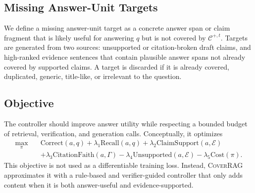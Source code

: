 \subsection{Missing Answer-Unit Targets}

We define a missing answer-unit target as a concrete answer span or claim fragment that is likely useful for answering $q$ but is not covered by $\mathcal{C}^{+,t}$. Targets are generated from two sources: unsupported or citation-broken draft claims, and high-ranked evidence sentences that contain plausible answer spans not already covered by supported claims. A target is discarded if it is already covered, duplicated, generic, title-like, or irrelevant to the question.

\subsection{Objective}

The controller should improve answer utility while respecting a bounded budget of retrieval, verification, and generation calls. Conceptually, it optimizes
\begin{align}
    \max_{\pi}\quad
    &\mathrm{Correct}(a,q)
    +\lambda_1\mathrm{Recall}(a,q)
    +\lambda_2\mathrm{ClaimSupport}(a,\mathcal{E}) \nonumber\\
    &+\lambda_3\mathrm{CitationFaith}(a,\Gamma)
    -\lambda_4\mathrm{Unsupported}(a,\mathcal{E})
    -\lambda_5\mathrm{Cost}(\pi).
\end{align}
This objective is not used as a differentiable training loss. Instead, \textsc{CoverRAG} approximates it with a rule-based and verifier-guided controller that only adds content when it is both answer-useful and evidence-supported.

